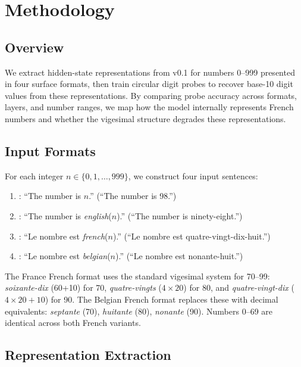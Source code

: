 \section{Methodology}
\label{sec:methodology}

\subsection{Overview}

We extract hidden-state representations from \mistral v0.1 \citep{jiang2023mistral} for numbers 0--999 presented in four surface formats, then train circular digit probes to recover base-10 digit values from these representations. By comparing probe accuracy across formats, layers, and number ranges, we map how the model internally represents French numbers and whether the vigesimal structure degrades these representations.

\subsection{Input Formats}
\label{sec:formats}

For each integer $n \in \{0, 1, \ldots, 999\}$, we construct four input sentences:

\begin{enumerate}[leftmargin=*,itemsep=2pt,topsep=2pt]
    \item \textbf{\digits}: ``The number is $n$.'' (\eg ``The number is 98.'')
    \item \textbf{\english}: ``The number is \textit{english}($n$).'' (\eg ``The number is ninety-eight.'')
    \item \textbf{\francefr}: ``Le nombre est \textit{french}($n$).'' (\eg ``Le nombre est quatre-vingt-dix-huit.'')
    \item \textbf{\belgianfr}: ``Le nombre est \textit{belgian}($n$).'' (\eg ``Le nombre est nonante-huit.'')
\end{enumerate}

The France French format uses the standard vigesimal system for 70--99: \emph{soixante-dix} (60+10) for 70, \emph{quatre-vingts} ($4\times20$) for 80, and \emph{quatre-vingt-dix} ($4\times20+10$) for 90. The Belgian French format replaces these with decimal equivalents: \emph{septante} (70), \emph{huitante} (80), \emph{nonante} (90). Numbers 0--69 are identical across both French variants.

\subsection{Representation Extraction}


